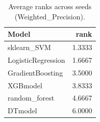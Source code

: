 \begin{table}[t]
\centering
\begin{tabular}{lr}
\toprule
Model & rank \\
\midrule
sklearn_SVM & 1.3333 \\
LogisticRegression & 1.6667 \\
GradientBoosting & 3.5000 \\
XGBmodel & 3.8333 \\
random_forest & 4.6667 \\
DTmodel & 6.0000 \\
\bottomrule
\end{tabular}
\caption{Average ranks across seeds (Weighted_Precision).}
\label{tab:avg_rank_Weighted_Precision}
\end{table}